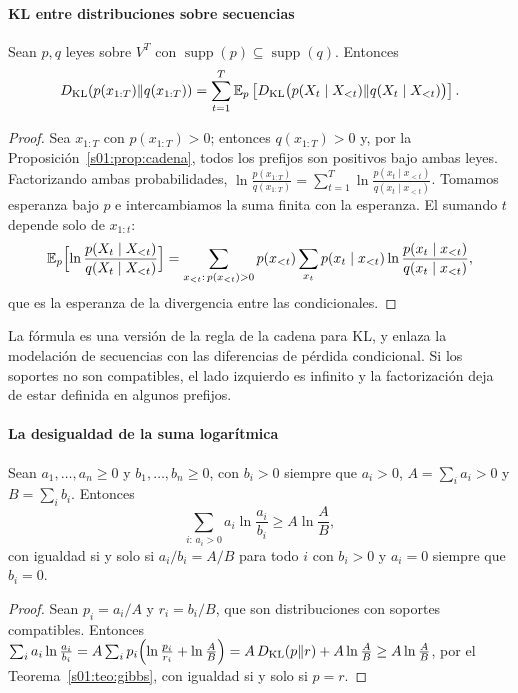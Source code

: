 \paragraph{KL entre distribuciones sobre secuencias}
\begin{proposicion}\label{s01:prop:cadenaKL}
Sean $p,q$ leyes sobre $V^T$ con $\operatorname{supp}(p)\subseteq\operatorname{supp}(q)$. Entonces
\[
D_{\rm KL}(p(x_{1:T})\|q(x_{1:T}))=
\sum_{t=1}^T\mathbb E_p\left[
D_{\rm KL}\bigl(p(X_t\mid X_{<t})\|q(X_t\mid X_{<t})\bigr)\right].
\]
\end{proposicion}
\begin{proof}
Sea $x_{1:T}$ con $p(x_{1:T})>0$; entonces $q(x_{1:T})>0$ y, por la
Proposición~\ref{s01:prop:cadena}, todos los prefijos son positivos bajo ambas
leyes. Factorizando ambas probabilidades,
$\ln\frac{p(x_{1:T})}{q(x_{1:T})}=\sum_{t=1}^T\ln\frac{p(x_t\mid x_{<t})}{q(x_t\mid x_{<t})}$.
Tomamos esperanza bajo $p$ e intercambiamos la suma finita con la esperanza. El
sumando $t$ depende solo de $x_{1:t}$:
\[
\mathbb E_p\Bigl[\ln\frac{p(X_t\mid X_{<t})}{q(X_t\mid X_{<t})}\Bigr]
=\sum_{x_{<t}:\,p(x_{<t})>0}p(x_{<t})\sum_{x_t}p(x_t\mid x_{<t})
\ln\frac{p(x_t\mid x_{<t})}{q(x_t\mid x_{<t})},
\]
que es la esperanza de la divergencia entre las condicionales.
\end{proof}
\noindent La fórmula es una versión de la regla de la cadena para KL, y enlaza la
modelación de secuencias con las diferencias de pérdida condicional. Si los
soportes no son compatibles, el lado izquierdo es infinito y la factorización deja
de estar definida en algunos prefijos.

\paragraph{La desigualdad de la suma logarítmica}
\begin{lema}\label{s01:lem:sumalog}
Sean $a_1,\ldots,a_n\ge0$ y $b_1,\ldots,b_n\ge0$, con $b_i>0$ siempre que $a_i>0$,
$A=\sum_ia_i>0$ y $B=\sum_ib_i$. Entonces
\[
\sum_{i:\,a_i>0}a_i\ln\frac{a_i}{b_i}\ge A\ln\frac AB,
\]
con igualdad si y solo si $a_i/b_i=A/B$ para todo $i$ con $b_i>0$ y $a_i=0$
siempre que $b_i=0$.
\end{lema}
\begin{proof}
Sean $p_i=a_i/A$ y $r_i=b_i/B$, que son distribuciones con soportes compatibles.
Entonces
$\sum_ia_i\ln\frac{a_i}{b_i}=A\sum_ip_i\Bigl(\ln\frac{p_i}{r_i}+\ln\frac AB\Bigr)
=A\,D_{\mathrm{KL}}(p\|r)+A\ln\frac AB\ge A\ln\frac AB$,
por el Teorema~\ref{s01:teo:gibbs}, con igualdad si y solo si $p=r$.
\end{proof}

